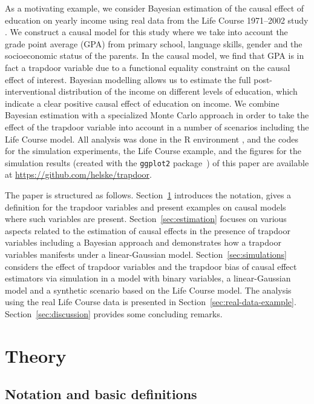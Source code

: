 \documentclass[11pt,a4paper,twoside]{article}
\newcommand{\+}[1]{\ensuremath{\mathbf{#1}}}
\begin{document}
	As a motivating example, we consider Bayesian estimation of the causal effect of education on yearly income using real data from the Life Course 1971--2002 study \citep{fsd}. We construct a causal model for this study where we take into account the grade point average (GPA) from primary school, language skills, gender and the socioeconomic status of the parents. In the causal model, we find that GPA is in fact a trapdoor variable due to a functional equality constraint on the causal effect of interest. Bayesian modelling allows us to estimate the full post-interventional distribution of the income on different levels of education, which indicate a clear positive causal effect of education on income.
	We combine Bayesian estimation with a specialized Monte Carlo approach in order to take the effect of the trapdoor variable into account in a number of scenarios including the Life Course model. All analysis was done in the R environment \citep{R}, and the codes for the simulation experiments, the Life Course example, and the figures for the simulation results (created with the \texttt{ggplot2} package~\citep{ggplot2}) of this paper are available at \url{https://github.com/helske/trapdoor}.

	The paper is structured as follows. Section~\ref{sec:theory} introduces the notation, gives a definition for the trapdoor variables and present examples on causal models where such variables are present. Section~\ref{sec:estimation} focuses on various aspects related to the estimation of causal effects in the presence of trapdoor variables including a Bayesian approach and demonstrates how a trapdoor variables manifests under a linear-Gaussian model. Section~\ref{sec:simulations} considers the effect of trapdoor variables and the trapdoor bias of causal effect estimators via simulation in a model with binary variables, a linear-Gaussian model and a synthetic scenario based on the Life Course model. The analysis using the real Life Course data is presented in Section~\ref{sec:real-data-example}. Section~\ref{sec:discussion} provides some concluding remarks.
	
\section{Theory}
\label{sec:theory}
	
\subsection{Notation and basic definitions}
\end{document}

